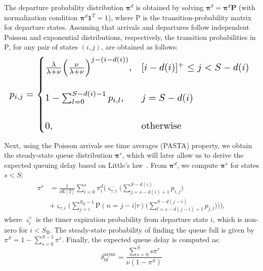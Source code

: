 \documentclass[10pt,journal,compsoc]{IEEEtran}
\begin{document}
The departure probability distribution $\boldsymbol{\pi}^d$ is obtained by solving $\boldsymbol{\pi}^d = \boldsymbol{\pi}^d \boldsymbol{\text{P}}$ (with normalization condition $\boldsymbol{\pi}^d \boldsymbol{1}^T = 1$), where $\text{P}$ is the transition-probability matrix for departure states. Assuming that arrivals and departures follow independent Poisson and exponential distributions, respectively, the transition probabilities in $\text{P}$, for any pair of states $(i,j)$, are obtained as follows:
\begin{equation}
\resizebox{\linewidth}{!}{%
	$p_{i,j} = \begin{cases}
	\frac{\lambda}{\lambda + \nu} \Big(\frac{\nu}{\lambda + \nu}\Big)^{j-(i-d(i))}, & [i - d(i)]^+ \leq j < S - d(i)
	\\
	\\
	1-\sum^{S-d(i)-1}_{l=0} p_{i,l}, & j = S - d(i)
	\\
	\\
	0, & \text{otherwise}
	\end{cases}$
}
\end{equation}

Next, using the Poisson arrivals see time averages (PASTA) property, we obtain the steady-state queue distribution $\boldsymbol{\pi}^s$, which will later allow us to derive the expected queuing delay based on Little's law~\cite{shortle2018fundamentals}. From $\boldsymbol{\pi}^d$, we compute $\boldsymbol{\pi}^s$ for states $s < S$:
\begin{equation}
\begin{split}
\pi^s &= \frac{1}{\nu \text{E}[T]} \sum_{i=0}^s \pi_i^d \bigg( \overline{\varsigma_{\tau,i}} \Big( \sum_{j=s-d(i)+1}^{S-d(i)} p_{i,j} \Big) \\
&+ \varsigma_{\tau,i} \Big( \sum_{j=i}^{S_\text{B}-1} \text{P}(n=j-i|\tau) \big(\sum_{l=s-d(j-i)+1}^{S-d(j-i)} p_{j,l}\big) \Big) \bigg),
\end{split}
\end{equation}
where $\varsigma^{\tau}_i$ is the timer expiration probability from departure state $i$, which is non-zero for $i<S_\text{B}$. The steady-state probability of finding the queue full is given by $\pi^S = 1-\sum^{S-1}_{s=0} \pi^{s}$. Finally, the expected queue delay is computed as:
\begin{equation}
\delta_\text{bf}^\text{async} = \frac{\sum_{s=0}^S s \pi^s}{\nu(1-\pi^S)}
\end{equation}
\end{document}
